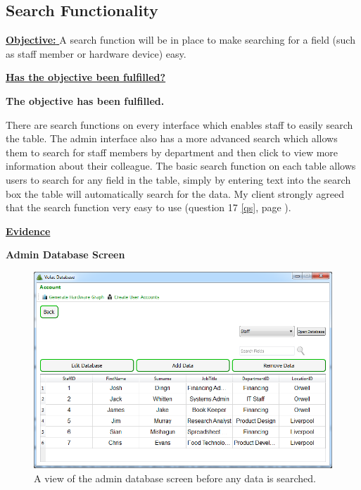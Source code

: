 \subsection{Search Functionality}\label{search}

\underline{\textbf{Objective:} }  A search function will be in place to make searching for a field (such as staff member or hardware device) easy.

\underline{\textbf{Has the objective been fulfilled?}}

\textbf{The objective has been fulfilled.}

There are search functions on every interface which enables staff to easily search the table. The admin interface also has a more advanced search which allows them to search for staff members by department and then click to view more information about their colleague. The basic search function on each table allows users to search for any field in the table, simply by entering text into the search box the table will automatically search for the data. My client strongly agreed that the search function very easy to use (question 17 \ref{qs}, page \pageref{qs}).

\underline{\textbf{Evidence}}

\textbf{Admin Database Screen}

\begin{figure}[H]
    \includegraphics[width=\textwidth]{./Evaluation/Images/beforeadminsearch.png}
    \caption{A view of the admin database screen before any data is searched.} 
\end{figure}


